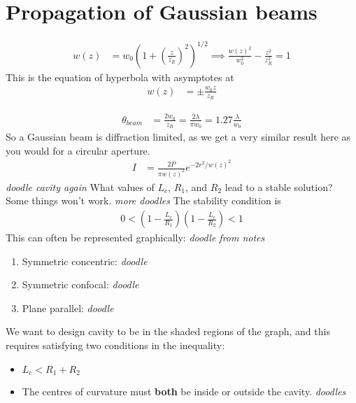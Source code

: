 \documentclass[a4paper, 11pt, normalem]{report}
\begin{document}
\section{Propagation of Gaussian beams}
\begin{align}
    w(z) &= w_0\left(1+\left(\frac{z}{z_R}\right)^2\right)^{1/2} \implies \frac{w(z)^2}{w_0^2} - \frac{z^2}{z^2_R} = 1
\end{align}
This is the equation of hyperbola with asymptotes at 
\begin{align}
    w(z) &= \pm\frac{w_0z}{z_R}
\end{align}
\begin{figure}[H]
    \centering
\end{figure}
\begin{align}
    \theta_{beam} &= \frac{2w_0}{z_R} = \frac{2\lambda}{\pi w_0} = 1.27\frac{\lambda}{w_0}
\end{align}
So a Gaussian beam is diffraction limited, as we get a very similar result here as you would for a circular aperture.
\begin{align}
    I &= \frac{2P}{\pi w(z)^2}e^{-2r^2/w(z)^2}
\end{align}
\textit{doodle cavity again}
What values of $L_c$, $R_1$, and $R_2$ lead to a stable solution?
Some things won't work. 
\textit{more doodles}
The stability condition is
\begin{align}
    0 < \left(1-\frac{L_c}{R_1}\right)\left(1-\frac{L_c}{R_2}\right) < 1
\end{align}
This can often be represented graphically:
\textit{doodle from notes}
\begin{enumerate}
    \item Symmetric concentric:
        \textit{doodle}
    \item Symmetric confocal:
        \textit{doodle}
    \item Plane parallel:
        \textit{doodle}
\end{enumerate}
We want to design cavity to be in the shaded regions of the graph, and this requires satisfying two conditions in the inequality:
\begin{itemize}
    \item $L_c < R_1 + R_2$
    \item The centres of curvature must \textbf{both} be inside or outside the cavity.
        \textit{doodles}
\end{itemize}
\end{document}
